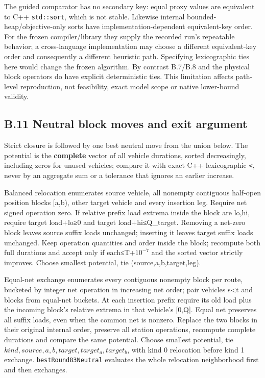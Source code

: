 \documentclass[
  american,
  11pt,
]{article}
\newcounter{none} %
\begin{document}
The guided comparator has no secondary key: equal proxy values are
equivalent to C++ \texttt{std::sort}, which is not
stable. Likewise internal bounded-heap/objective-only sorts have
implementation-dependent equivalent-key order. For the frozen
compiler/library they supply the recorded run's repeatable behavior; a
cross-language implementation may choose a different equivalent-key
order and consequently a different heuristic path. Specifying
lexicographic ties here would change the frozen algorithm. By contrast
B.7/B.8 and the physical block operators do have explicit deterministic
ties. This limitation affects path-level reproduction, not feasibility,
exact model scope or native lower-bound validity.

\subsection{B.11 Neutral block moves and exit
argument}\label{b.11-neutral-block-moves-and-exit-argument}

Strict closure is followed by one best neutral move from the union
below. The potential is the \textbf{complete} vector of all vehicle
durations, sorted decreasingly, including zeros for unused vehicles;
compare it with exact C++ lexicographic \texttt{<},
never by an aggregate sum or a tolerance that ignores an earlier
increase.

Balanced relocation enumerates source vehicle, all nonempty contiguous
half-open position blocks {[}a,b), other target vehicle and every
insertion leg. Require net signed operation zero. If relative prefix
load extrema inside the block are lo,hi, require target load+lo≥0 and
target load+hi≤Q\_\allowbreak{}target. Removing a net-zero block leaves source suffix
loads unchanged; inserting it leaves target suffix loads unchanged. Keep
operation quantities and order inside the block; recompute both full
durations and accept only if each≤T+\(10^{-7}\) and the sorted vector
strictly improves. Choose smallest potential, tie
(source,a,b,target,leg).

Equal-net exchange enumerates every contiguous nonempty block per route,
bucketed by integer net operation in increasing net order; pair vehicles
s\textless t and blocks from equal-net buckets. At each insertion prefix
require its old load plus the incoming block's relative extrema in that
vehicle's {[}0,Q{]}. Equal net preserves all suffix loads, even when the
common net is nonzero. Replace the two blocks in their original internal
order, preserve all station operations, recompute complete durations and
compare the same potential. Choose smallest potential, tie
\(kind,source,a,b,target,target_a,target_b\), with kind 0 relocation
before kind 1 exchange. \texttt{bestRound83Neutral}
evaluates the whole relocation neighborhood first and then exchanges.
\end{document}
